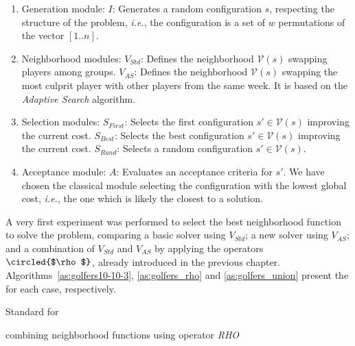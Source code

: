\begin{enumerate}
	\item Generation module:
	\subitem $I$: Generates a random configuration $s$, respecting the structure of the problem, {\it i.e.}, the configuration is a set of $w$ permutations of the vector $[1..n]$. 
	\item Neighborhood modules:
	\subitem $V_{Std}$: Defines the neighborhood $\mathcal{V}\left(s\right)$ swapping players among groups.
	\subitem $V_{AS}$: Defines the neighborhood $\mathcal{V}\left(s\right)$ swapping the most culprit player with other players from the same week. It is based on the {\it Adaptive Search} algorithm.
	\item Selection modules:
	\subitem $S_{First}$: Selects the first configuration $s' \in \mathcal{V}\left(s\right)$ improving the current cost.
	\subitem $S_{Best}$: Selects the best configuration $s' \in \mathcal{V}\left(s\right)$ improving the current cost.
	\subitem $S_{Rand}$: Selects a random configuration $s' \in \mathcal{V}\left(s\right)$.
	\item Acceptance module:
	\subitem $A$: Evaluates an acceptance criteria for $s'$. We have chosen the classical module selecting the configuration with the lowest global cost, {\it i.e.}, the one which is likely the closest to a solution.
\end{enumerate}

A very first experiment was performed to select the best neighborhood function to solve the problem, comparing a basic solver using $V_{Std}$; a new solver using $V_{AS}$; and a combination of $V_{Std}$ and $V_{AS}$ by applying the operators $\circled{$\rho$}$, already introduced in the previous chapter. Algorithms~\ref{as:golfers10-10-3}, \ref{as:golfers_rho} and \ref{as:golfers_union} present the \as{} for each case, respectively.

\begin{algorithm}[H]
\dontprintsemicolon
\SetNoline
{}
\caption{Standard \as{} for \SGP}\label{as:golfers10-10-3}
\end{algorithm}

\begin{algorithm}[H]
\dontprintsemicolon
\SetNoline
{}
\caption{\As{} combining neighborhood functions using operator {\it RHO}}\label{as:golfers_rho}
\end{algorithm}

